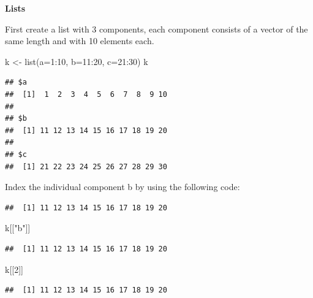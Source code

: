 \documentclass[
]{book}
\newenvironment{Shaded}{\begin{snugshade}}{\end{snugshade}}
\newcommand{\AttributeTok}[1]{\textcolor[rgb]{0.77,0.63,0.00}{#1}}
\newcommand{\DecValTok}[1]{\textcolor[rgb]{0.00,0.00,0.81}{#1}}
\newcommand{\FunctionTok}[1]{\textcolor[rgb]{0.00,0.00,0.00}{#1}}
\newcommand{\NormalTok}[1]{#1}
\newcommand{\OtherTok}[1]{\textcolor[rgb]{0.56,0.35,0.01}{#1}}
\newcommand{\SpecialCharTok}[1]{\textcolor[rgb]{0.00,0.00,0.00}{#1}}
\newcommand{\StringTok}[1]{\textcolor[rgb]{0.31,0.60,0.02}{#1}}
\begin{document}
\textbf{Lists}

First create a list with 3 components, each component consists of a vector of the same length and with 10 elements each.

\begin{Shaded}
\begin{Highlighting}[]
\NormalTok{k }\OtherTok{\textless{}{-}} \FunctionTok{list}\NormalTok{(}\AttributeTok{a=}\DecValTok{1}\SpecialCharTok{:}\DecValTok{10}\NormalTok{, }\AttributeTok{b=}\DecValTok{11}\SpecialCharTok{:}\DecValTok{20}\NormalTok{, }\AttributeTok{c=}\DecValTok{21}\SpecialCharTok{:}\DecValTok{30}\NormalTok{)}
\NormalTok{k}
\end{Highlighting}
\end{Shaded}

\begin{verbatim}
## $a
##  [1]  1  2  3  4  5  6  7  8  9 10
## 
## $b
##  [1] 11 12 13 14 15 16 17 18 19 20
## 
## $c
##  [1] 21 22 23 24 25 26 27 28 29 30
\end{verbatim}

Index the individual component b by using the following code:

\begin{Shaded}
\end{Shaded}

\begin{verbatim}
##  [1] 11 12 13 14 15 16 17 18 19 20
\end{verbatim}

\begin{Shaded}
\begin{Highlighting}[]
\NormalTok{k[[}\StringTok{"b"}\NormalTok{]]}
\end{Highlighting}
\end{Shaded}

\begin{verbatim}
##  [1] 11 12 13 14 15 16 17 18 19 20
\end{verbatim}

\begin{Shaded}
\begin{Highlighting}[]
\NormalTok{k[[}\DecValTok{2}\NormalTok{]]}
\end{Highlighting}
\end{Shaded}

\begin{verbatim}
##  [1] 11 12 13 14 15 16 17 18 19 20
\end{verbatim}
\end{document}

